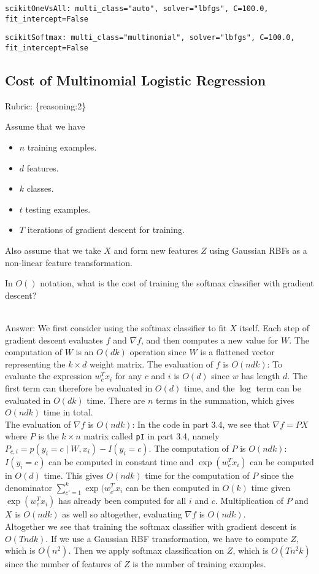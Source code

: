 \documentclass{article}
\def\rubric#1{\gre{Rubric: \{#1\}}}{}
\def\blu#1{{\color{blu}#1}}
\def\gre#1{{\color{gre}#1}}
\def\ans#1{\gre{Answer: #1}}{}
\def\items#1{\begin{itemize}#1\end{itemize}}
\def\enum#1{\begin{enumerate}#1\end{enumerate}}
\begin{document}
\gre{
	\texttt{scikitOneVsAll: multi\_class="auto", solver="lbfgs", C=100.0, fit\_intercept=False}}

\gre{
	\texttt{scikitSoftmax: multi\_class="multinomial", solver="lbfgs", C=100.0, fit\_intercept=False}}

\subsection{Cost of Multinomial Logistic Regression}
\rubric{reasoning:2}

Assume that we have
\items{
	\item $n$ training examples.
	\item $d$ features.
	\item $k$ classes.
	\item $t$ testing examples.
	\item $T$ iterations of gradient descent for training.
}
Also assume that we take $X$ and form new features $Z$ using Gaussian RBFs as a non-linear feature transformation.
\enum{\blu{
		\item In $O()$ notation, what is the cost of training the softmax classifier with gradient descent?
	}
	\\\ans{We first consider using the softmax classifier to fit $X$ itself. Each step of gradient descent evaluates $f$ and $\nabla f$, and then computes a new value for $W$. The computation of $W$ is an $O(dk)$ operation since $W$ is a flattened vector representing the $k \times d$ weight matrix. The evaluation of $f$ is $O(ndk)$: To evaluate the expression $w_c^Tx_i$ for any $c$ and $i$ is $O(d)$ since $w$ has length $d$. The first term can therefore be evaluated in $O(d)$ time, and the $\log$ term can be evaluated in $O(dk)$ time. There are $n$ terms in the summation, which gives $O(ndk)$ time in total. 
		\medskip\\ The evaluation of $\nabla f$ is $O(ndk)$: In the code in part 3.4, we see that $\nabla f = P X$ where $P$ is the $k \times n$ matrix called \texttt{pI} in part 3.4, namely $P_{c,i} = p(y_i = c \mid W,x_i) - I(y_i = c)$. The computation of $P$ is $O(ndk)$: $I(y_i = c)$ can be computed in constant time and $\exp(w_c^T x_i)$ can be computed in $O(d)$ time. This gives $O(ndk)$ time for the computation of $P$ since the denominator $\sum_{c'=1}^k \exp(w_{c'}^Tx_i$ can be then computed in $O(k)$ time given $\exp(w_c^T x_i)$ has already been computed for all $i$ and $c$. Multiplication of $P$ and $X$ is $O(ndk)$ as well so altogether, evaluating $\nabla f$ is $O(ndk)$.
		\medskip\\ Altogether we see that training the softmax classifier with gradient descent is $O(Tndk)$. If we use a Gaussian RBF transformation, we have to compute $Z$, which is $O(n^2)$. Then we apply softmax classification on $Z$, which is $O(Tn^2k)$ since the number of features of $Z$ is the number of training examples.
}}
\end{document}
